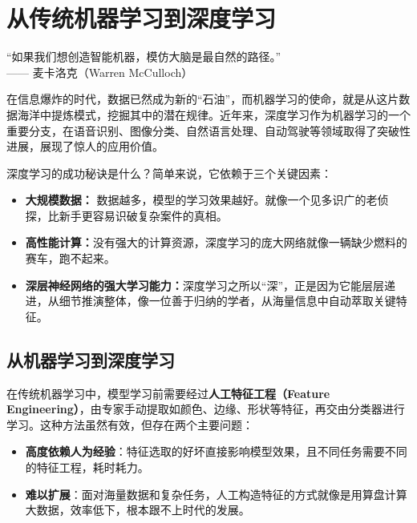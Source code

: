 
\chapter{从传统机器学习到深度学习}


\begin{flushright}
“如果我们想创造智能机器，模仿大脑是最自然的路径。” \\
—— 麦卡洛克（Warren McCulloch）
\end{flushright}

在信息爆炸的时代，数据已然成为新的“石油”，而机器学习的使命，就是从这片数据海洋中提炼模式，挖掘其中的潜在规律。近年来，深度学习作为机器学习的一个重要分支，在语音识别、图像分类、自然语言处理、自动驾驶等领域取得了突破性进展，展现了惊人的应用价值。

深度学习的成功秘诀是什么？简单来说，它依赖于三个关键因素：
\begin{itemize}
\item  {\bf 大规模数据：} 数据越多，模型的学习效果越好。就像一个见多识广的老侦探，比新手更容易识破复杂案件的真相。
\item {\bf 高性能计算：}没有强大的计算资源，深度学习的庞大网络就像一辆缺少燃料的赛车，跑不起来。
\item {\bf 深层神经网络的强大学习能力：}深度学习之所以“深”，正是因为它能层层递进，从细节推演整体，像一位善于归纳的学者，从海量信息中自动萃取关键特征。
\end{itemize}

\section{从机器学习到深度学习}
在传统机器学习中，模型学习前需要经过{\bf 人工特征工程（Feature Engineering）}，由专家手动提取如颜色、边缘、形状等特征，再交由分类器进行学习。这种方法虽然有效，但存在两个主要问题：
\begin{itemize}
    \item \textbf{高度依赖人为经验}：特征选取的好坏直接影响模型效果，且不同任务需要不同的特征工程，耗时耗力。
    \item \textbf{难以扩展}：面对海量数据和复杂任务，人工构造特征的方式就像是用算盘计算大数据，效率低下，根本跟不上时代的发展。
\end{itemize}

